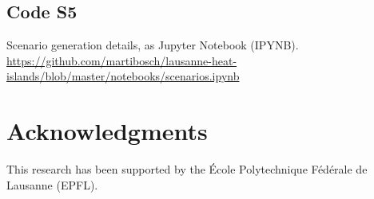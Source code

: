 \documentclass[10pt,letterpaper]{article}
\begin{document}
\subsection*{Code S5}
\label{code-scenarios}
Scenario generation details, as Jupyter Notebook (IPYNB).
\url{https://github.com/martibosch/lausanne-heat-islands/blob/master/notebooks/scenarios.ipynb}

\section*{Acknowledgments}
This research has been supported by the \'Ecole Polytechnique F\'ed\'erale de Lausanne (EPFL).

\nolinenumbers




\end{document}
